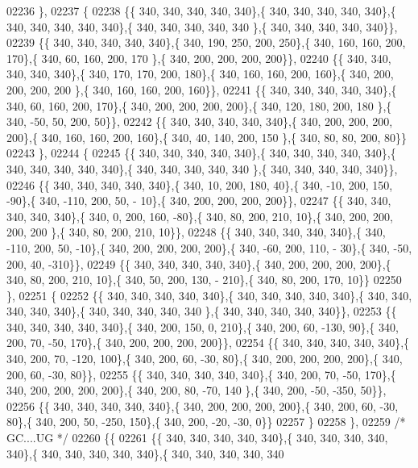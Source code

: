 \begin{DoxyCode}
02236 \},
02237 \{
02238 \{\{ 340, 340, 340, 340, 340\},\{ 340, 340, 340, 340, 340\},\{ 340, 340, 340, 340, 340\},\{ 340, 340, 340, 340, 340
      \},\{ 340, 340, 340, 340, 340\}\},
02239 \{\{ 340, 340, 340, 340, 340\},\{ 340, 190, 250, 200, 250\},\{ 340, 160, 160, 200, 170\},\{ 340,  60, 160, 200, 170
      \},\{ 340, 200, 200, 200, 200\}\},
02240 \{\{ 340, 340, 340, 340, 340\},\{ 340, 170, 170, 200, 180\},\{ 340, 160, 160, 200, 160\},\{ 340, 200, 200, 200, 200
      \},\{ 340, 160, 160, 200, 160\}\},
02241 \{\{ 340, 340, 340, 340, 340\},\{ 340,  60, 160, 200, 170\},\{ 340, 200, 200, 200, 200\},\{ 340, 120, 180, 200, 180
      \},\{ 340, -50,  50, 200,  50\}\},
02242 \{\{ 340, 340, 340, 340, 340\},\{ 340, 200, 200, 200, 200\},\{ 340, 160, 160, 200, 160\},\{ 340,  40, 140, 200, 150
      \},\{ 340,  80,  80, 200,  80\}\}
02243 \},
02244 \{
02245 \{\{ 340, 340, 340, 340, 340\},\{ 340, 340, 340, 340, 340\},\{ 340, 340, 340, 340, 340\},\{ 340, 340, 340, 340, 340
      \},\{ 340, 340, 340, 340, 340\}\},
02246 \{\{ 340, 340, 340, 340, 340\},\{ 340,  10, 200, 180,  40\},\{ 340, -10, 200, 150, -90\},\{ 340, -110, 200,  50, -
      10\},\{ 340, 200, 200, 200, 200\}\},
02247 \{\{ 340, 340, 340, 340, 340\},\{ 340,   0, 200, 160, -80\},\{ 340,  80, 200, 210,  10\},\{ 340, 200, 200, 200, 200
      \},\{ 340,  80, 200, 210,  10\}\},
02248 \{\{ 340, 340, 340, 340, 340\},\{ 340, -110, 200,  50, -10\},\{ 340, 200, 200, 200, 200\},\{ 340, -60, 200, 110, -
      30\},\{ 340, -50, 200,  40, -310\}\},
02249 \{\{ 340, 340, 340, 340, 340\},\{ 340, 200, 200, 200, 200\},\{ 340,  80, 200, 210,  10\},\{ 340,  50, 200, 130, -
      210\},\{ 340,  80, 200, 170,  10\}\}
02250 \},
02251 \{
02252 \{\{ 340, 340, 340, 340, 340\},\{ 340, 340, 340, 340, 340\},\{ 340, 340, 340, 340, 340\},\{ 340, 340, 340, 340, 340
      \},\{ 340, 340, 340, 340, 340\}\},
02253 \{\{ 340, 340, 340, 340, 340\},\{ 340, 200, 150,   0, 210\},\{ 340, 200,  60, -130,  90\},\{ 340, 200,  70, -50, 
      170\},\{ 340, 200, 200, 200, 200\}\},
02254 \{\{ 340, 340, 340, 340, 340\},\{ 340, 200,  70, -120, 100\},\{ 340, 200,  60, -30,  80\},\{ 340, 200, 200, 200, 
      200\},\{ 340, 200,  60, -30,  80\}\},
02255 \{\{ 340, 340, 340, 340, 340\},\{ 340, 200,  70, -50, 170\},\{ 340, 200, 200, 200, 200\},\{ 340, 200,  80, -70, 140
      \},\{ 340, 200, -50, -350,  50\}\},
02256 \{\{ 340, 340, 340, 340, 340\},\{ 340, 200, 200, 200, 200\},\{ 340, 200,  60, -30,  80\},\{ 340, 200,  50, -250, 
      150\},\{ 340, 200, -20, -30,   0\}\}
02257 \}
02258 \},
02259 \textcolor{comment}{/* GC....UG */}
02260 \{\{
02261 \{\{ 340, 340, 340, 340, 340\},\{ 340, 340, 340, 340, 340\},\{ 340, 340, 340, 340, 340\},\{ 340, 340, 340, 340, 340

\end{DoxyCode}
